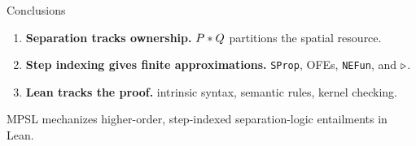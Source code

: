\documentclass[10pt,aspectratio=169]{beamer}
\begin{document}
\begin{frame}{Conclusions}
  \begin{enumerate}
    \item \textbf{Separation tracks ownership.}
      \quad $P\mathbin{*} Q$ partitions the spatial resource.
    \item \textbf{Step indexing gives finite approximations.}
      \quad \texttt{SProp}, OFEs, \texttt{NEFun}, and $\mathord{\triangleright}$.
    \item \textbf{Lean tracks the proof.}
      \quad intrinsic syntax, semantic rules, kernel checking.
  \end{enumerate}

  \vspace{0.65cm}
  \begin{center}
    \Large\textcolor{PKURed}{MPSL mechanizes higher-order, step-indexed
      separation-logic entailments in Lean.}
  \end{center}
\end{frame}
\end{document}
